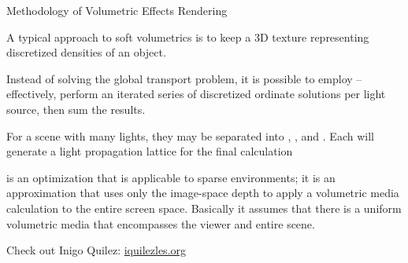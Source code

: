 \documentclass[11pt]{article}
\begin{document}
\begin{topic}{Methodology of Volumetric Effects Rendering}
	\item A typical approach to soft volumetrics is to keep a 3D texture representing discretized densities of an object.
	\item Instead of solving the global transport problem, it is possible to employ  -- effectively, perform an iterated series of discretized ordinate solutions per light source, then sum the results.
	\item For a scene with many lights, they may be separated into , , and . Each will generate a light propagation lattice for the final calculation
	\item {} is an optimization that is applicable to sparse environments; it is an approximation that uses only the image-space depth to apply a volumetric media calculation to the entire screen space. Basically it assumes that there is a uniform volumetric media that encompasses the viewer and entire scene.
	\item Check out Inigo Quilez: \url{iquilezles.org}
\end{topic}
\end{document}
